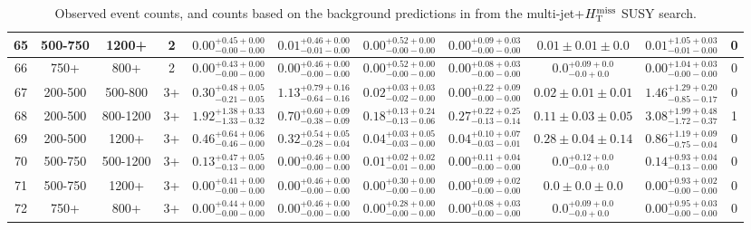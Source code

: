 \begin{table}
{\begin{tabular}{ |c|c|c|c||c|c|c|c|c||c|c| }
65 & 500-750 & 1200+ & 2 & $0.00^{+0.45+0.00}_{-0.00-0.00}$ & $0.01^{+0.46+0.00}_{-0.01-0.00}$ & $0.00^{+0.52+0.00}_{-0.00-0.00}$ & $0.00^{+0.09+0.03}_{-0.00-0.00}$ &$0.01\pm 0.01 \pm0.0$& $0.01^{+1.05+0.03}_{-0.01-0.00}$ & 0 \\ \hline
66 & 750+ & 800+ & 2 & $0.00^{+0.43+0.00}_{-0.00-0.00}$ & $0.00^{+0.46+0.00}_{-0.00-0.00}$ & $0.00^{+0.52+0.00}_{-0.00-0.00}$ & $0.00^{+0.08+0.03}_{-0.00-0.00}$ &$0.0^{+0.09+0.0}_{-0.0+0.0}$& $0.00^{+1.04+0.03}_{-0.00-0.00}$ & 0 \\ \hline
67 & 200-500 & 500-800 & 3+ & $0.30^{+0.48+0.05}_{-0.21-0.05}$ & $1.13^{+0.79+0.16}_{-0.64-0.16}$ & $0.02^{+0.03+0.03}_{-0.02-0.00}$ & $0.00^{+0.22+0.09}_{-0.00-0.00}$ &$0.02\pm 0.01 \pm0.01$& $1.46^{+1.29+0.20}_{-0.85-0.17}$ & 0 \\ \hline
68 & 200-500 & 800-1200 & 3+ & $1.92^{+1.38+0.33}_{-1.33-0.32}$ & $0.70^{+0.60+0.09}_{-0.38-0.09}$ & $0.18^{+0.13+0.24}_{-0.13-0.06}$ & $0.27^{+0.22+0.25}_{-0.13-0.14}$ &$0.11\pm 0.03 \pm0.05$& $3.08^{+1.99+0.48}_{-1.72-0.37}$ & 1 \\ \hline
69 & 200-500 & 1200+ & 3+ & $0.46^{+0.64+0.06}_{-0.46-0.00}$ & $0.32^{+0.54+0.05}_{-0.28-0.04}$ & $0.04^{+0.03+0.05}_{-0.03-0.00}$ & $0.04^{+0.10+0.07}_{-0.03-0.01}$ &$0.28\pm 0.04 \pm0.14$& $0.86^{+1.19+0.09}_{-0.75-0.04}$ & 0 \\ \hline
70 & 500-750 & 500-1200 & 3+ & $0.13^{+0.47+0.05}_{-0.13-0.00}$ & $0.00^{+0.46+0.00}_{-0.00-0.00}$ & $0.01^{+0.02+0.02}_{-0.01-0.00}$ & $0.00^{+0.11+0.04}_{-0.00-0.00}$ &$0.0^{+0.12+0.0}_{-0.0+0.0}$& $0.14^{+0.93+0.04}_{-0.13-0.00}$ & 0 \\ \hline
71 & 500-750 & 1200+ & 3+ & $0.00^{+0.41+0.00}_{-0.00-0.00}$ & $0.00^{+0.46+0.00}_{-0.00-0.00}$ & $0.00^{+0.30+0.00}_{-0.00-0.00}$ & $0.00^{+0.09+0.02}_{-0.00-0.00}$ &$0.0\pm 0.0 \pm0.0$& $0.00^{+0.93+0.02}_{-0.00-0.00}$ & 0 \\ \hline
72 & 750+ & 800+ & 3+ & $0.00^{+0.44+0.00}_{-0.00-0.00}$ & $0.00^{+0.46+0.00}_{-0.00-0.00}$ & $0.00^{+0.28+0.00}_{-0.00-0.00}$ & $0.00^{+0.08+0.03}_{-0.00-0.00}$ &$0.0^{+0.09+0.0}_{-0.0+0.0}$& $0.00^{+0.95+0.03}_{-0.00-0.00}$ & 0 \\ \hline
\end{tabular}
}
\caption{Observed event counts, and counts based on the background predictions in  from the multi-jet+$H_{\text{T}}^{\rm miss}$ SUSY search.}
\end{table}

